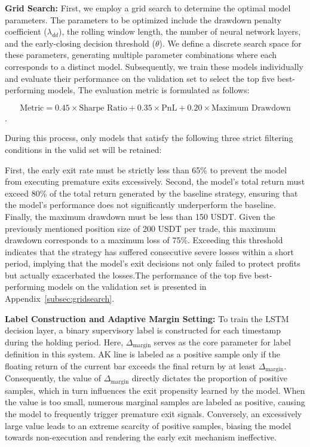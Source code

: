 \documentclass[12pt]{article}
\begin{document}
\textbf{Grid Search:} First, we employ a grid search to determine the optimal model parameters. The parameters to be optimized include the drawdown penalty coefficient ($\lambda_{dd}$), the rolling window length, the number of neural network layers, and the early-closing decision threshold ($\theta$). We define a discrete search space for these parameters, generating multiple parameter combinations where each corresponds to a distinct model. Subsequently, we train these models individually and evaluate their performance on the validation set to select the top five best-performing models, The evaluation metric is formulated as follows:

\begin{equation}\label{eq:performanceMetric}
    \text{Metric} = 0.45 \times \text{Sharpe Ratio} + 0.35 \times \text{PnL} + 0.20 \times \text{Maximum Drawdown}
\end{equation}. 

During this process, only models that satisfy the following three strict filtering conditions in the valid set will be retained:

First, the early exit rate must be strictly less than 65\% to prevent the model from executing premature exits excessively. Second, the model's total return must exceed 80\% of the total return generated by the baseline strategy, ensuring that the model's performance does not significantly underperform the baseline. Finally, the maximum drawdown must be less than 150 USDT. Given the previously mentioned position size of 200 USDT per trade, this maximum drawdown corresponds to a maximum loss of 75\%. Exceeding this threshold indicates that the strategy has suffered consecutive severe losses within a short period, implying that the model's exit decisions not only failed to protect profits but actually exacerbated the losses.The performance of the top five best-performing models on the validation set is presented in Appendix~\ref{subsec:gridsearch}.

\textbf{Label Construction and Adaptive Margin Setting:} To train the LSTM decision layer, a binary supervisory label is constructed for each timestamp during the holding period. Here, $\Delta_{\text{margin}}$ serves as the core parameter for label definition in this system. AK line is labeled as a positive sample only if the floating return of the current bar exceeds the final return by at least $\Delta_{\text{margin}}$. Consequently, the value of $\Delta_{\text{margin}}$ directly dictates the proportion of positive samples, which in turn influences the exit propensity learned by the model. When the value is too small, numerous marginal samples are labeled as positive, causing the model to frequently trigger premature exit signals. Conversely, an excessively large value leads to an extreme scarcity of positive samples, biasing the model towards non-execution and rendering the early exit mechanism ineffective.
\end{document}
